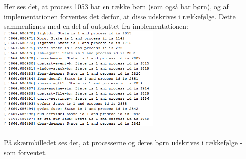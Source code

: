 Her ses det, at process 1053 har en række børn (som også har børn), og af implementationen forventes det derfor, at disse udskrives i rækkefølge. Dette sammenlignes med en del af outputtet fra implementationen:\\
\includegraphics[width=0.6\textwidth]{Testing/DFS2.png}\\
\\
På skærmbilledet ses det, at processerne og deres børn udskrives i rækkefølge - som forventet.